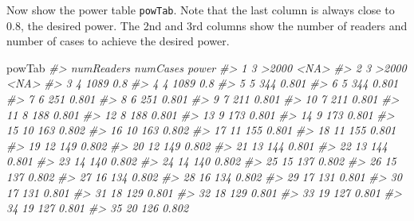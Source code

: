 \documentclass[
]{book}
\newenvironment{Shaded}{\begin{snugshade}}{\end{snugshade}}
\newcommand{\CommentTok}[1]{\textcolor[rgb]{0.56,0.35,0.01}{\textit{#1}}}
\newcommand{\NormalTok}[1]{#1}
\begin{document}
Now show the power table \texttt{powTab}. Note that the last column is always close to 0.8, the desired power. The 2nd and 3rd columns show the number of readers and number of cases to achieve the desired power.

\begin{Shaded}
\begin{Highlighting}[]
\NormalTok{powTab}
\CommentTok{\#\textgreater{}     numReaders numCases power}
\CommentTok{\#\textgreater{} 1            3    \textgreater{}2000  \textless{}NA\textgreater{}}
\CommentTok{\#\textgreater{} 2            3    \textgreater{}2000  \textless{}NA\textgreater{}}
\CommentTok{\#\textgreater{} 3            4     1089   0.8}
\CommentTok{\#\textgreater{} 4            4     1089   0.8}
\CommentTok{\#\textgreater{} 5            5      344 0.801}
\CommentTok{\#\textgreater{} 6            5      344 0.801}
\CommentTok{\#\textgreater{} 7            6      251 0.801}
\CommentTok{\#\textgreater{} 8            6      251 0.801}
\CommentTok{\#\textgreater{} 9            7      211 0.801}
\CommentTok{\#\textgreater{} 10           7      211 0.801}
\CommentTok{\#\textgreater{} 11           8      188 0.801}
\CommentTok{\#\textgreater{} 12           8      188 0.801}
\CommentTok{\#\textgreater{} 13           9      173 0.801}
\CommentTok{\#\textgreater{} 14           9      173 0.801}
\CommentTok{\#\textgreater{} 15          10      163 0.802}
\CommentTok{\#\textgreater{} 16          10      163 0.802}
\CommentTok{\#\textgreater{} 17          11      155 0.801}
\CommentTok{\#\textgreater{} 18          11      155 0.801}
\CommentTok{\#\textgreater{} 19          12      149 0.802}
\CommentTok{\#\textgreater{} 20          12      149 0.802}
\CommentTok{\#\textgreater{} 21          13      144 0.801}
\CommentTok{\#\textgreater{} 22          13      144 0.801}
\CommentTok{\#\textgreater{} 23          14      140 0.802}
\CommentTok{\#\textgreater{} 24          14      140 0.802}
\CommentTok{\#\textgreater{} 25          15      137 0.802}
\CommentTok{\#\textgreater{} 26          15      137 0.802}
\CommentTok{\#\textgreater{} 27          16      134 0.802}
\CommentTok{\#\textgreater{} 28          16      134 0.802}
\CommentTok{\#\textgreater{} 29          17      131 0.801}
\CommentTok{\#\textgreater{} 30          17      131 0.801}
\CommentTok{\#\textgreater{} 31          18      129 0.801}
\CommentTok{\#\textgreater{} 32          18      129 0.801}
\CommentTok{\#\textgreater{} 33          19      127 0.801}
\CommentTok{\#\textgreater{} 34          19      127 0.801}
\CommentTok{\#\textgreater{} 35          20      126 0.802}

\end{Highlighting}
\end{Shaded}
\end{document}

